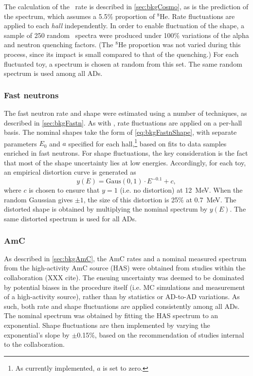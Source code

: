\documentclass[../thesis.tex]{subfiles}
\begin{document}
The calculation of the \LiHe\ rate is described in \autoref{sec:bkgCosmo}, as is the prediction of the spectrum, which assumes a 5.5\% proportion of $^8$He. Rate fluctuations are applied to each \emph{hall} independently. In order to enable fluctuation of the shape, a sample of 250 random \LiHe\ spectra were produced under 100\% variations of the alpha and neutron quenching factors. (The $^8$He proportion was not varied during this process, since its impact is small compared to that of the quenching.) For each fluctuated toy, a spectrum is chosen at random from this set. The same random spectrum is used among all ADs.

\subsubsection{Fast neutrons}

The fast neutron rate and shape were estimated using a number of techniques, as described in \autoref{sec:bkgFastn}. As with \LiHe, rate fluctuations are applied on a per-hall basis. The nominal shapes take the form of \autoref{eq:bkgFastnShape}, with separate parameters $E_0$ and $a$ specified for each hall,\footnote{As currently implemented, $a$ is set to zero.} based on fits to data samples enriched in fast neutrons. For shape fluctuations, the key consideration is the fact that most of the shape uncertainty lies at low energies. Accordingly, for each toy, an empirical distortion curve is generated as
\begin{equation*}
  y(E) = \mathrm{Gaus}(0,1) \cdot E^{-0.1} + c,
\end{equation*}
where $c$ is chosen to ensure that $y = 1$ (i.e. no distortion) at 12~MeV. When the random Gaussian gives $\pm 1$, the size of this distortion is 25\% at 0.7~MeV. The distorted shape is obtained by multiplying the nominal spectrum by $y(E)$. The same distorted spectrum is used for all ADs.

\subsubsection{AmC}

As described in \autoref{sec:bkgAmC}, the AmC rates and a nominal measured spectrum from the high-activity AmC source (HAS) were obtained from studies within the collaboration (XXX cite). The ensuing uncertainty was deemed to be dominated by potential biases in the procedure itself (i.e. MC simulations and measurement of a high-activity source), rather than by statistics or AD-to-AD variations. As such, both rate and shape fluctuations are applied consistently among all ADs. The nominal spectrum was obtained by fitting the HAS spectrum to an exponential. Shape fluctuations are then implemented by varying the exponential's slope by $\pm$0.15\%, based on the recommendation of studies internal to the collaboration.
\end{document}
